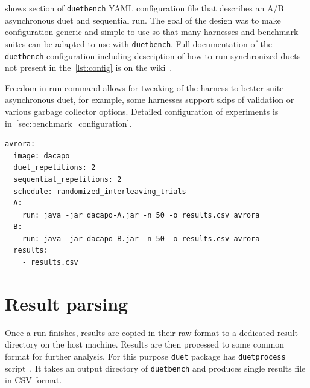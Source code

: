  shows section of \lstinline{duetbench} YAML configuration file that describes an A/B asynchronous duet and sequential run.
The goal of the design was to make configuration generic and simple to use so that many harnesses and benchmark suites can be adapted to use with \lstinline{duetbench}.
Full documentation of the \lstinline{duetbench} configuration including description of how to run synchronized duets not present in the~\cref{lst:config} is on the wiki~\cite{wiki}.

Freedom in run command allows for tweaking of the harness to better suite asynchronous duet, for example, some harnesses support skips of validation or various garbage collector options.
Detailed configuration of experiments is in~\cref{sec:benchmark_configuration}.

\begin{listing}
    \begin{lstlisting}
avrora:
  image: dacapo
  duet_repetitions: 2
  sequential_repetitions: 2
  schedule: randomized_interleaving_trials
  A:
    run: java -jar dacapo-A.jar -n 50 -o results.csv avrora
  B:
    run: java -jar dacapo-B.jar -n 50 -o results.csv avrora
  results:
    - results.csv
    \end{lstlisting}
    \caption{
        Example part of YAML configuration file for \lstinline{duetbench} that runs \lstinline{avrora} benchmark from the DaCapo suite.
        In this case, both A and B versions are packaged in a single container image as Java JAR archives.
        Run command specifies how to invoke the DaCapo harness --- 50 iterations, results in \lstinline{results.csv} and run only \lstinline{avrora} benchmark.
        All the result files or directories need to be specified in \lstinline{results} array field.
        Note the correspondence between user input fields from this configuration and parameters in angled brackets from~\cref{fig:duetbench_sequence}.
        Furthermore, users can specify the number of repetitions for both asynchronous duet and sequential measurements, as well as the scheduling strategy for those runs.
    }
    \label{lst:config}
\end{listing}

\section{Result parsing}
\label{sec:result_parsing}

Once a run finishes, results are copied in their raw format to a dedicated result directory on the host machine.
Results are then processed to some common format for further analysis.
For this purpose \lstinline{duet} package has \lstinline{duetprocess} script~\cite{wiki}.
It takes an output directory of \lstinline{duetbench} and produces single results file in CSV format.

